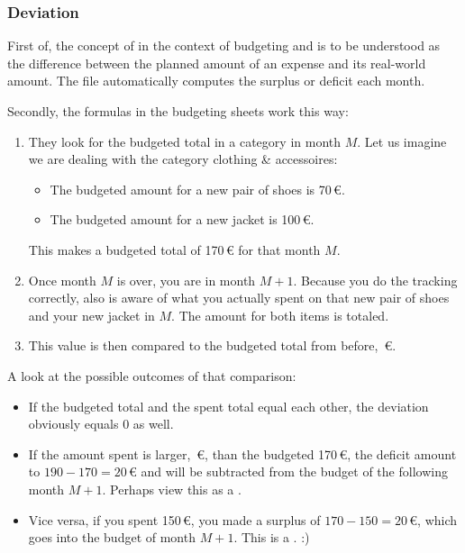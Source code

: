 \subsubsection{Deviation}
\label{subsubsec:budeting-deviation}

First of, the concept of  in the context of budgeting and \tfn is to be understood as the difference between the planned amount of an expense and its real-world amount.
The file automatically computes the surplus or deficit each month.

Secondly, the formulas in the budgeting sheets work this way:
\begin{enumerate}
	\item They look for the budgeted total in a category in month \( M \).
	Let us imagine we are dealing with the category clothing \& accessoires:
	\begin{itemize}
		\item The budgeted amount for a new pair of shoes is 70\,€.
		\item The budgeted amount for a new jacket is 100\,€.
	\end{itemize}
	This makes a budgeted total of 170\,€ for that month \( M \).
	\item Once month \( M \) is over, you are in month \( M+1 \).
	Because you do the tracking correctly, \tfn also is aware of what you actually spent on that new pair of shoes and your new jacket in \( M \).
	The amount for both items is totaled.
	\item This value is then compared to the budgeted total from before, \,€.
\end{enumerate}

A look at the possible outcomes of that comparison:
\begin{itemize}
	\item If the budgeted total and the spent total equal each other, the deviation obviously equals 0 as well.
	\item If the amount spent is larger, \,€, than the budgeted 170\,€, the deficit amount to \( 190-170 = 20\)\,€ and will be subtracted from the budget of the following month \( M+1 \).
	Perhaps view this as a .
	\item Vice versa, if you spent 150\,€, you made a surplus of \( 170-150 = 20 \)\,€, which goes into the budget of month \( M+1 \).
	This is a . :)
\end{itemize}

